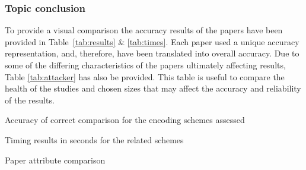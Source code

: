 \subsubsection{Topic conclusion}

To provide a visual comparison the accuracy results of the papers have been provided in Table~\ref{tab:results} \& \ref{tab:times}. Each paper used a unique accuracy representation, and, therefore, have been translated into overall accuracy. Due to some of the differing characteristics of the papers ultimately affecting results, Table \ref{tab:attacker} has also be provided. This table is useful to compare the health of the studies and chosen sizes that may affect the accuracy and reliability of the results.

\begin{table}
    \makebox[\textwidth][c]{
        
    }%
    \caption{Accuracy of correct comparison for the encoding schemes assessed}
    \label{tab:results}
\end{table}

\begin{table}
    \makebox[\textwidth][c]{
        
    }%
    \caption{Timing results in seconds for the related schemes}
    \label{tab:times}
\end{table}

\begin{table}
    \makebox[\textwidth][c]{
        
    }%
    \caption{Paper attribute comparison}
    \label{tab:attacker}
\end{table}

